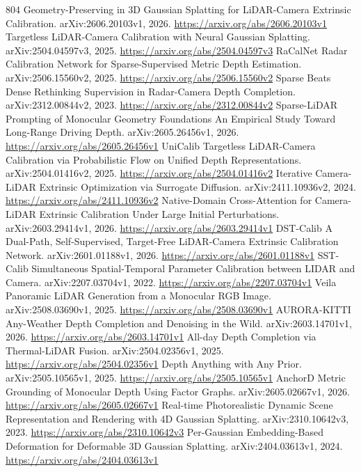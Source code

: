 \documentclass[11pt]{article}
\begin{document}
\begin{thebibliography}{804}
 Geometry-Preserving in 3D Gaussian Splatting for LiDAR-Camera Extrinsic Calibration. arXiv:2606.20103v1, 2026. \url{https://arxiv.org/abs/2606.20103v1}
 Targetless LiDAR-Camera Calibration with Neural Gaussian Splatting. arXiv:2504.04597v3, 2025. \url{https://arxiv.org/abs/2504.04597v3}
 RaCalNet Radar Calibration Network for Sparse-Supervised Metric Depth Estimation. arXiv:2506.15560v2, 2025. \url{https://arxiv.org/abs/2506.15560v2}
 Sparse Beats Dense Rethinking Supervision in Radar-Camera Depth Completion. arXiv:2312.00844v2, 2023. \url{https://arxiv.org/abs/2312.00844v2}
 Sparse-LiDAR Prompting of Monocular Geometry Foundations An Empirical Study Toward Long-Range Driving Depth. arXiv:2605.26456v1, 2026. \url{https://arxiv.org/abs/2605.26456v1}
 UniCalib Targetless LiDAR-Camera Calibration via Probabilistic Flow on Unified Depth Representations. arXiv:2504.01416v2, 2025. \url{https://arxiv.org/abs/2504.01416v2}
 Iterative Camera-LiDAR Extrinsic Optimization via Surrogate Diffusion. arXiv:2411.10936v2, 2024. \url{https://arxiv.org/abs/2411.10936v2}
 Native-Domain Cross-Attention for Camera-LiDAR Extrinsic Calibration Under Large Initial Perturbations. arXiv:2603.29414v1, 2026. \url{https://arxiv.org/abs/2603.29414v1}
 DST-Calib A Dual-Path, Self-Supervised, Target-Free LiDAR-Camera Extrinsic Calibration Network. arXiv:2601.01188v1, 2026. \url{https://arxiv.org/abs/2601.01188v1}
 SST-Calib Simultaneous Spatial-Temporal Parameter Calibration between LIDAR and Camera. arXiv:2207.03704v1, 2022. \url{https://arxiv.org/abs/2207.03704v1}
 Veila Panoramic LiDAR Generation from a Monocular RGB Image. arXiv:2508.03690v1, 2025. \url{https://arxiv.org/abs/2508.03690v1}
 AURORA-KITTI Any-Weather Depth Completion and Denoising in the Wild. arXiv:2603.14701v1, 2026. \url{https://arxiv.org/abs/2603.14701v1}
 All-day Depth Completion via Thermal-LiDAR Fusion. arXiv:2504.02356v1, 2025. \url{https://arxiv.org/abs/2504.02356v1}
 Depth Anything with Any Prior. arXiv:2505.10565v1, 2025. \url{https://arxiv.org/abs/2505.10565v1}
 AnchorD Metric Grounding of Monocular Depth Using Factor Graphs. arXiv:2605.02667v1, 2026. \url{https://arxiv.org/abs/2605.02667v1}
 Real-time Photorealistic Dynamic Scene Representation and Rendering with 4D Gaussian Splatting. arXiv:2310.10642v3, 2023. \url{https://arxiv.org/abs/2310.10642v3}
 Per-Gaussian Embedding-Based Deformation for Deformable 3D Gaussian Splatting. arXiv:2404.03613v1, 2024. \url{https://arxiv.org/abs/2404.03613v1}

\end{thebibliography}
\end{document}
